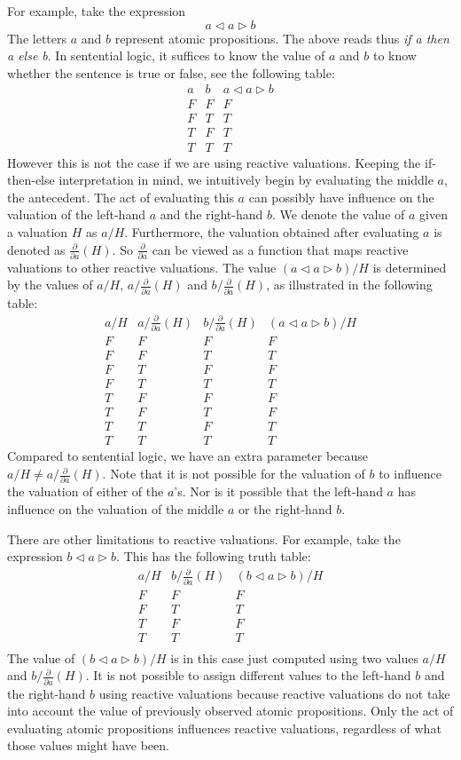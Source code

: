 \documentclass[a4paper,twoside,openright]{report}
\newcommand{\dd}[1]{\frac{\partial}{\partial #1}}
\newcommand{\lef}{\ensuremath{\triangleleft}}
\newcommand{\rig}{\ensuremath{\triangleright}}
\begin{document}
For example, take the expression
\[
a\lef a\rig b
\]
The letters $a$ and $b$ represent atomic propositions. The above reads thus \emph{if a then a else b}. In sentential logic, it suffices to know the value of $a$ and $b$ to know whether the sentence is true or false, see the following table:
\[
\begin{array}{cc|c}
a & b & a\lef a\rig b\\
\hline
F & F & F\\
F & T & T\\
T & F & T\\
T & T & T
\end{array}
\]
However this is not the case if we are using reactive valuations. Keeping the if-then-else interpretation in mind, we intuitively begin by evaluating the middle $a$, the antecedent. The act of evaluating this $a$ can possibly have influence on the valuation of the left-hand $a$ and the right-hand $b$. We denote the value of $a$ given a valuation $H$ as $a/H$. Furthermore, the valuation obtained after evaluating $a$ is denoted as $\dd a(H)$. So $\dd a$ can be viewed as a function that maps reactive valuations to other reactive valuations. The value $(a\lef a\rig b)/H$ is determined by the values of $a/H$, $a/\dd a(H)$ and $b/\dd a(H)$, as illustrated in the following table: 
\[
\begin{array}{ccc|c}
a/H & a/\dd a(H) & b/\dd a(H) & (a\lef a \rig b)/H\\
\hline
F & F & F & F\\
F & F & T & T\\
F & T & F & F\\
F & T & T & T\\
T & F & F & F\\
T & F & T & F\\
T & T & F & T\\
T & T & T & T
\end{array}
\]
Compared to sentential logic, we have an extra parameter because $a/H\ne a/\dd a(H)$. Note that it is not possible for the valuation of $b$ to influence the valuation of either of the $a$'s. Nor is it possible that the left-hand $a$ has influence on the valuation of the middle $a$ or the right-hand $b$.

There are other limitations to reactive valuations. For example, take the expression $b\lef a\rig b$. This has the following truth table:
\[
\begin{array}{cc|c}
a/H & b/\dd a(H) & (b\lef a\rig b)/H\\
\hline
F & F & F\\
F & T & T\\
T & F & F\\
T & T & T\\
\end{array}
\]
The value of $(b\lef a\rig b)/H$ is in this case just computed using two values $a/H$ and $b/\dd a(H)$. It is not possible to assign different values to the left-hand $b$ and the right-hand $b$ using reactive valuations because reactive valuations do not take into account the value of previously observed atomic propositions. Only the act of evaluating atomic propositions influences reactive valuations, regardless of what those values might have been.
\end{document}
